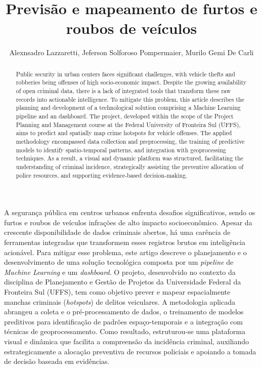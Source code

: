 \documentclass[12pt]{article}
\title{Previsão e mapeamento de furtos e roubos de veículos}
\author{Alexnsadro Lazzaretti\inst{1}, Jeferson Solforoso Pompermaier\inst{2},
Murilo Gemi De Carli\inst{1} }
\begin{document}
 

\maketitle

\begin{abstract}
Public security in urban centers faces significant challenges, with vehicle thefts and robberies being offenses of high socio-economic impact. Despite the growing availability of open criminal data, there is a lack of integrated tools that transform these raw records into actionable intelligence. To mitigate this problem, this article describes the planning and development of a technological solution comprising a Machine Learning pipeline and an dashboard. The project, developed within the scope of the Project Planning and Management course at the Federal University of Fronteira Sul (UFFS), aims to predict and spatially map crime hotspots for vehicle offenses. The applied methodology encompassed data collection and preprocessing, the training of predictive models to identify spatio-temporal patterns, and integration with geoprocessing techniques. As a result, a visual and dynamic platform was structured, facilitating the understanding of criminal incidence, strategically assisting the preventive allocation of police resources, and supporting evidence-based decision-making.
\end{abstract}

\begin{resumo}
A segurança pública em centros urbanos enfrenta desafios significativos, sendo os furtos e roubos de veículos infrações de alto impacto socioeconômico. Apesar da crescente disponibilidade de dados criminais abertos, há uma carência de ferramentas integradas que transformem esses registros brutos em inteligência acionável. Para mitigar esse problema, este artigo descreve o planejamento e o desenvolvimento de uma solução tecnológica composta por um \textit{pipeline} de \textit{Machine Learning} e um \textit{dashboard}. O projeto, desenvolvido no contexto da disciplina de Planejamento e Gestão de Projetos da Universidade Federal da Fronteira Sul (UFFS), tem como objetivo prever e mapear espacialmente manchas criminais (\textit{hotspots}) de delitos veiculares. A metodologia aplicada abrangeu a coleta e o pré-processamento de dados, o treinamento de modelos preditivos para identificação de padrões espaço-temporais e a integração com técnicas de geoprocessamento. Como resultado, estruturou-se uma plataforma visual e dinâmica que facilita a compreensão da incidência criminal, auxiliando estrategicamente a alocação preventiva de recursos policiais e apoiando a tomada de decisão baseada em evidências.
\end{resumo}
\end{document}
